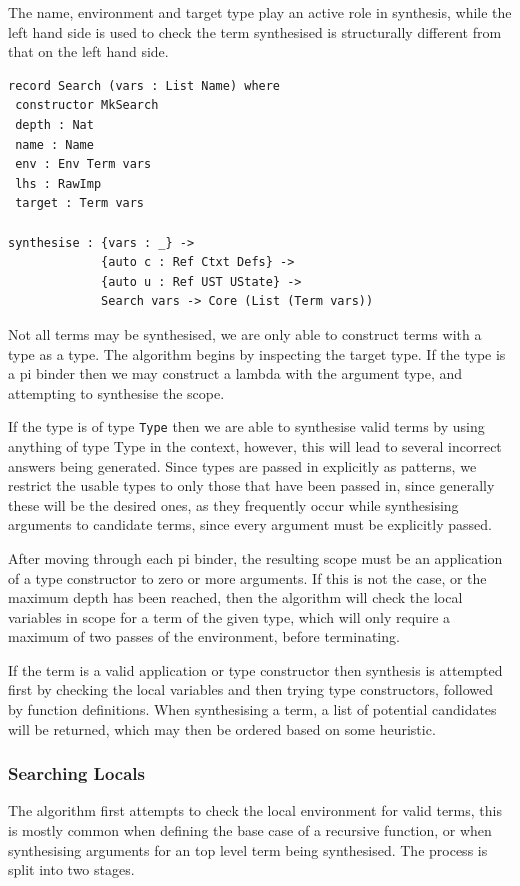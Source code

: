 \documentclass[a4paper]{article}
\begin{document}
The name, environment and target type play an active role in synthesis, while the left hand side is used to check the term 
synthesised is structurally different from that on the left hand side. 

\begin{center}
\begin{verbatim}
record Search (vars : List Name) where
 constructor MkSearch
 depth : Nat
 name : Name
 env : Env Term vars
 lhs : RawImp
 target : Term vars 

synthesise : {vars : _} -> 
			 {auto c : Ref Ctxt Defs} -> 
			 {auto u : Ref UST UState} ->
			 Search vars -> Core (List (Term vars))

\end{verbatim}
\end{center}


Not all terms may be synthesised, we are only able to construct terms with a type as a type. The algorithm begins by 
inspecting the target type. If the type is a pi binder then we may construct a lambda with  
the argument type, and attempting to synthesise the scope.

If the type is of type \texttt{Type} then we are able to synthesise valid terms by using anything of type Type in the context,
however, this will lead to several incorrect answers being generated. Since types are passed in explicitly as patterns, 
we restrict the usable types to only those that have been passed in, since generally these will be the desired ones, 
as they frequently occur while synthesising arguments to candidate terms, since every argument must be explicitly passed.

After moving through each pi binder, the resulting scope must be an application of a type constructor to zero or more
arguments. If this is not the case, or the maximum depth has been reached, then the algorithm will check the local 
variables in scope for a term of the given type, which will only require a maximum of two passes of the environment,
before terminating. 

If the term is a valid application or type constructor then synthesis is attempted first by checking the 
local variables and then trying type constructors, followed by function definitions. When synthesising a term, a list of potential 
candidates will be returned, which may then be ordered based on some heuristic.

\subsubsection{Searching Locals}
\label{sec:orgbc2d082}
The algorithm first attempts to check the local environment for valid terms, this is mostly common when defining the 
base case of a recursive function, or when synthesising arguments for an top level term being synthesised. The process is split 
into two stages. 
\end{document}
